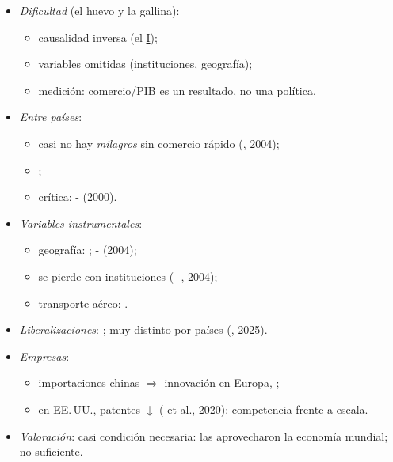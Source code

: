 \documentclass{article}
\begin{document}
\begin{columnas}
\begin{itemize}
\item \emph{Dificultad} (el huevo y la gallina):
  \begin{itemize}
  \item causalidad inversa (el \hyperref[rep:I]{I});
  \item variables omitidas (instituciones, geografía);
  \item medición: comercio/PIB es un resultado, no una política.
  \end{itemize}
\item \emph{Entre países}:
  \begin{itemize}
  \item casi no hay \emph{milagros} sin comercio rápido (, 2004);
  \item {};
  \item crítica: - (2000).
  \end{itemize}
\item \emph{Variables instrumentales}:
  \begin{itemize}
  \item geografía: ; - (2004);
  \item se pierde con instituciones (--, 2004);
  \item transporte aéreo: .
  \end{itemize}
\item \emph{Liberalizaciones}: ; muy distinto por países (, 2025).
\item \emph{Empresas}:
  \begin{itemize}
  \item importaciones chinas $\Rightarrow$ innovación en Europa, ;
  \item en EE.\,UU., patentes $\downarrow$ ( et al., 2020): competencia frente a escala.
  \end{itemize}
\item \emph{Valoración}: casi condición necesaria: las  aprovecharon la economía mundial; no suficiente.
\end{itemize}


\end{columnas}
\end{document}
